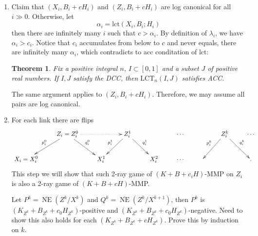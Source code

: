 \documentclass{article}
\newtheorem{thm}[defn]{Theorem}
\begin{document}
\begin{enumerate}
  \item Claim that $ (X_i,B_i+cH_i) $ and $ (Z_i,B_i+cH_i) $ are log canonical for all $ i\gg 0 $. Otherwise, let
  \[ \alpha_i=\mathrm{lct}(X_i,B_i;H_i) \]
  then there are infinitely many $ i $ such that $ c>\alpha_i $. By definition of $ \lambda_i $, we have $ \alpha_i>c_i $. Notice that $ c_i $ accumulates from below to $ c $ and never equals, there are infinitely many $ \alpha_i $, which contradicts to acc conditation of lct:

\begin{thm}
  \cite[Theorem 1.1]{birkarAscendingChainCondition2007}  Fix a positive integral $ n $, $ I\subset [0,1] $ and a subset $ J $ of positive real numbers. If $ I,J $ satisfy the DCC, then $ \mathrm{LCT}_n(I,J) $ satisfies ACC.
\end{thm}

  The same argument applies to $ (Z_i,B_i+cH_i) $. Therefore, we may assume all pairs are log canonical.
  \item For each link there are flips
  \[ \xymatrix{
    &Z_{i}=Z_i^0\ar[ld]_{p^0_i}\ar[dr]^{q^0_i}\ar@{.>}[rr]&&Z_i^1\ar[ld]_{p^1_i}\ar[rd]^{q^1_i}&&\cdots&&Z_i^k\ar[ld]_{p^k_i}\ar[dr]^{q^k_i}&\cdots\\
    X_i=X^0_i &&X^1_i&&X_i^2&\cdots&&&
.}\]
  This step we will show that such 2-ray game of $ (K+B+c_iH) $-MMP on $ Z_i $ is also a 2-ray game of $ (K+B+cH) $-MMP.

  Let $ P^k=\overline{\operatorname{NE}}(Z^k/X^k) $ and $ Q^k=\overline{\operatorname{NE}}(Z^k/X^{k+1}) $, then $ P^k $ is $ (K_{Z^k}+B_{Z^k}+c_0H_{Z^k}) $-positive and $ (K_{Z^k}+B_{Z^k}+c_0H_{Z^k}) $-negative. Need to show this also holds for each $ (K_{Z^k}+B_{Z^k}+cH_{Z^k}) $. Prove this by induction on $ k $.
  

\end{enumerate}
\end{document}
